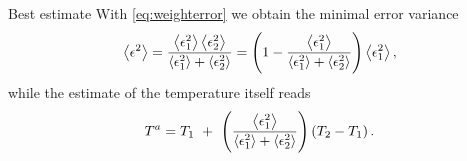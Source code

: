 
\begin{frame}{Best estimate}
With \eqref{eq:weighterror} we obtain the minimal error variance
\begin{equation}
\left\langle \epsilon^2 \right\rangle= {\left\langle \epsilon_1^2 \right\rangle \left\langle \epsilon_2^2 \right\rangle \over \left\langle \epsilon_1^2 \right\rangle 
+ \left\langle \epsilon_2^2 \right\rangle } = \left( 1 - {\left\langle \epsilon_1^2 \right\rangle \over \left\langle \epsilon_1^2 \right\rangle 
+ \left\langle \epsilon_2^2 \right\rangle } \right) \left\langle \epsilon_1^2 \right\rangle,
\label{eq:optimalerror}
\end{equation}
while the estimate of the temperature itself reads
\begin{equation}
{T}^a= T_1 ~+~ \left( {\left\langle \epsilon_1^2 \right\rangle \over \left\langle \epsilon_1^2 \right\rangle 
+ \left\langle \epsilon_2^2 \right\rangle } \right) \left( T_2-T_1\right).
 \label{eq:analyzedT}
\end{equation}
\begin{center}
\end{center}
\end{frame}



